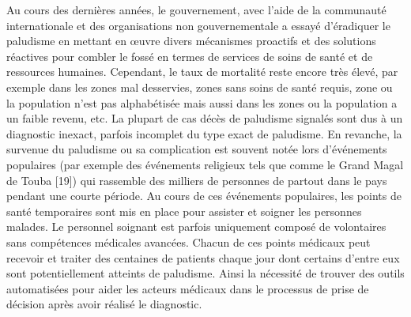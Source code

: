 Au cours des dernières années, le gouvernement, avec l'aide de la communauté internationale et des  organisations non gouvernementale a essayé d’éradiquer le paludisme en mettant en œuvre divers mécanismes proactifs et des solutions réactives pour combler le fossé en termes de services de soins de santé et de ressources humaines. Cependant, le taux de mortalité reste  encore très élevé, par exemple dans les zones mal desservies, zones sans soins de santé requis, zone ou la population n’est pas alphabétisée mais aussi dans les zones ou la population a un  faible revenu, etc. La plupart de cas décès de paludisme signalés sont  dus à un diagnostic inexact, parfois incomplet du type exact de paludisme. En revanche, la survenue du paludisme ou sa complication est souvent notée lors d'événements populaires (par exemple des événements religieux tels que comme le Grand Magal de Touba [19]) qui rassemble des milliers de personnes de partout dans le pays pendant une courte période. Au cours de ces événements populaires, les points de santé temporaires sont mis en place pour assister et soigner les personnes malades. Le personnel soignant est parfois uniquement composé de volontaires sans compétences médicales avancées.
Chacun de ces points médicaux peut recevoir et traiter des centaines de patients chaque jour dont  certains d'entre eux sont potentiellement atteints de paludisme. 
Ainsi la nécessité de trouver des outils automatisées pour aider les acteurs médicaux dans le processus de prise de décision après avoir réalisé le diagnostic.
